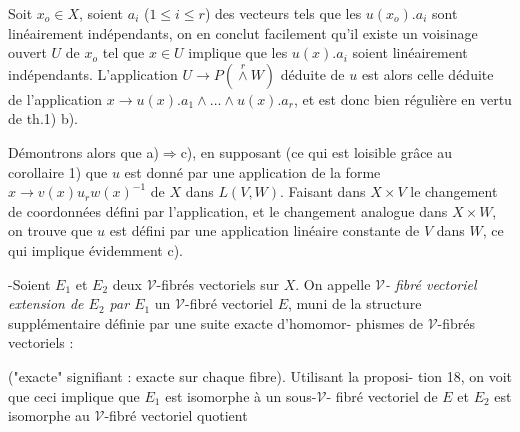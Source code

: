Soit $x_o \in X$, soient $a_i$ ($1 \leqslant i \leqslant r$) des vecteurs tels que les $u(x_o).a_i$ sont
linéairement indépendants, on en conclut facilement qu'il existe un
voisinage ouvert $U$ de $x_o$ tel que $x \in U$ implique que les $u(x).a_i$ soient
linéairement indépendants. L'application $U \to P(\overset{r}{\wedge} W)$ déduite de $u$ est
alors celle déduite de l'application \quad $x \to u(x).a_1 \wedge \dots \wedge u(x).a_r$, et
est donc bien régulière en vertu de th.1) b).

Démontrons alors que a)$\Rightarrow$c), en supposant (ce qui est loisible
grâce au corollaire 1) que $u$ est donné par une application de la forme
$x \to v(x)u_r w(x)^{-1}$ de $X$ dans $L(V,W)$. Faisant dans $X \times V$ le changement de
coordonnées défini par l'application, et le changement analogue dans
$X \times W$, on trouve que $u$ est défini par une application linéaire constante
de $V$ dans $W$, ce qui implique évidemment c).

-Soient $E_1$ et $E_2$ deux $\mathcal{V}$-fibrés vectoriels sur $X$. On appelle \emph{$\mathcal{V}$-
fibré vectoriel extension de $E_2$ par $E_1$} un $\mathcal{V}$-fibré vectoriel $E$, muni
de la structure supplémentaire définie par une suite exacte d'homomor-
phismes de $\mathcal{V}$-fibrés vectoriels :
\begin{center}
\end{center}
("exacte" signifiant : exacte sur chaque fibre). Utilisant la proposi-
tion 18, on voit que ceci implique que $E_1$ est isomorphe à un sous-$\mathcal{V}$-
fibré vectoriel de $E$ et $E_2$ est isomorphe au $\mathcal{V}$-fibré vectoriel quotient

\newpage



